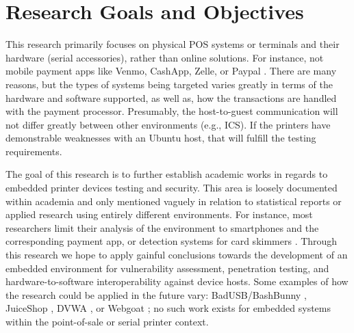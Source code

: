 \section{Research Goals and Objectives}  \label{significance}

This research primarily focuses on physical POS systems or terminals and their hardware (serial accessories), rather than online solutions. For instance, not mobile payment apps like Venmo, CashApp, Zelle, or Paypal \autocite{wangMobilePaymentSecurity2016}. There are many reasons, but the types of systems being targeted varies greatly in terms of the hardware and software supported, as well as, how the transactions are handled with the payment  processor. Presumably, the host-to-guest communication will not differ greatly
between other environments (e.g., ICS). If the printers have demonstrable weaknesses with an Ubuntu host, that will fulfill the testing requirements.

The goal of this research is to further establish academic works in regards to embedded printer devices testing and security. This area is loosely documented within academia and only mentioned vaguely in relation to statistical reports or applied research using entirely different environments. For instance, most researchers limit their analysis of the environment to smartphones and the corresponding payment app, or detection systems for card skimmers \autocite{scaifeFearReaperCharacterization2018}. Through this research we hope to apply gainful conclusions towards the development of an embedded environment for vulnerability assessment, penetration testing, and hardware-to-software interoperability against device hosts. Some examples of how the research could be applied in the future vary: BadUSB/BashBunny \autocite{hak5BashBunny}, JuiceShop \autocite{OWASPJuiceShop}, DVWA \autocite{woodDAMNVULNERABLEWEB2023}, or Webgoat \autocite{OWASPWebGoatOWASP}; no such work exists for embedded systems within the point-of-sale or serial printer context.



